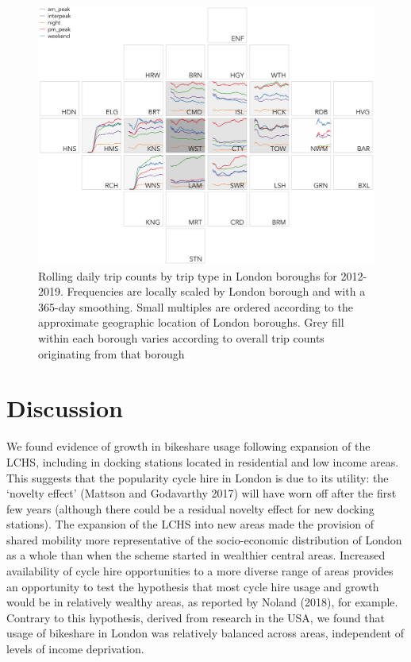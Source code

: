 \documentclass[
]{article}
\begin{document}
\begin{figure}

{\centering \includegraphics[width=1\linewidth]{figures/trip_types_by_borough_minor} 

}

\caption{Rolling daily trip counts by trip type in London boroughs for 2012-2019. Frequencies are locally scaled by London borough and with a 365-day smoothing. Small multiples are ordered according to the approximate geographic location of London boroughs. Grey fill within each borough varies according to overall trip counts originating from that borough}\label{fig:trip-types-boroughs}
\end{figure}

\hypertarget{discussion}{%
\section{Discussion}\label{discussion}}

We found evidence of growth in bikeshare usage following expansion of the LCHS, including in docking stations located in residential and low income areas.
This suggests that the popularity cycle hire in London is due to its utility:
the `novelty effect' (Mattson and Godavarthy 2017) will have worn off after the first few years (although there could be a residual novelty effect for new docking stations).
The expansion of the LCHS into new areas made the provision of shared mobility more representative of the socio-economic distribution of London as a whole than when the scheme started in wealthier central areas.
Increased availability of cycle hire opportunities to a more diverse range of areas provides an opportunity to test the hypothesis that most cycle hire usage and growth would be in relatively wealthy areas, as reported by Noland (2018), for example.
Contrary to this hypothesis, derived from research in the USA, we found that usage of bikeshare in London was relatively balanced across areas, independent of levels of income deprivation.
\end{document}
